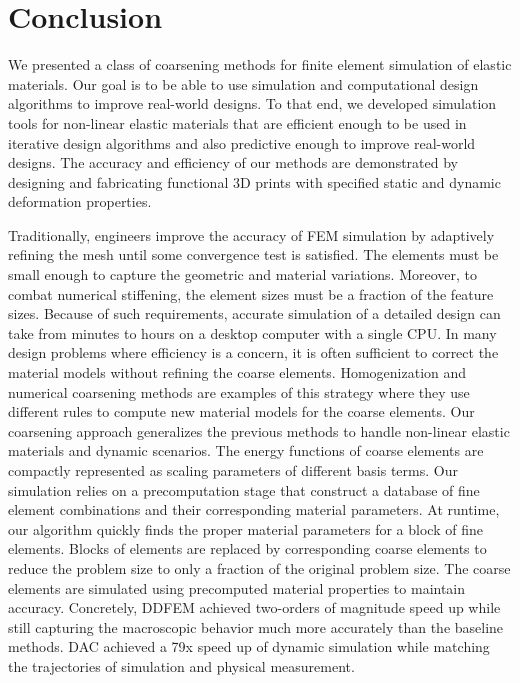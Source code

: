 \chapter{Conclusion}
We presented a class of coarsening methods for finite element simulation of elastic materials.
Our goal is to be able to use simulation and computational design algorithms to improve real-world designs.
To that end, we developed simulation tools for non-linear elastic materials that are efficient enough to be used in iterative design algorithms and also predictive enough to improve real-world designs.
The accuracy and efficiency of our methods are demonstrated by designing and fabricating functional 3D prints with specified static and dynamic deformation properties.

Traditionally, engineers improve the accuracy of FEM simulation by adaptively refining the mesh until some convergence test is satisfied.
The elements must be small enough to capture the geometric and material variations.
Moreover, to combat numerical stiffening, the element sizes must be a fraction of the feature sizes.
Because of such requirements, accurate simulation of a detailed design can take from minutes to hours on a desktop computer with a single CPU.
In many design problems where efficiency is a concern, it is often sufficient to correct the material models without refining the coarse elements.
Homogenization and numerical coarsening methods are examples of this strategy where they use different rules to compute new material models for the coarse elements.
Our coarsening approach generalizes the previous methods to handle non-linear elastic materials and dynamic scenarios.
The energy functions of coarse elements are compactly represented as scaling parameters of different basis terms.
Our simulation relies on a precomputation stage that construct a database of fine element combinations and their corresponding material parameters.
At runtime, our algorithm quickly finds the proper material parameters for a block of fine elements.
Blocks of elements are replaced by corresponding coarse elements to reduce the problem size to only a fraction of the original problem size.
The coarse elements are simulated using precomputed material properties to maintain accuracy.
Concretely, DDFEM achieved two-orders of magnitude speed up while still capturing the macroscopic behavior much more accurately than the baseline methods.
DAC achieved a 79x speed up of dynamic simulation while matching the trajectories of simulation and physical measurement.

